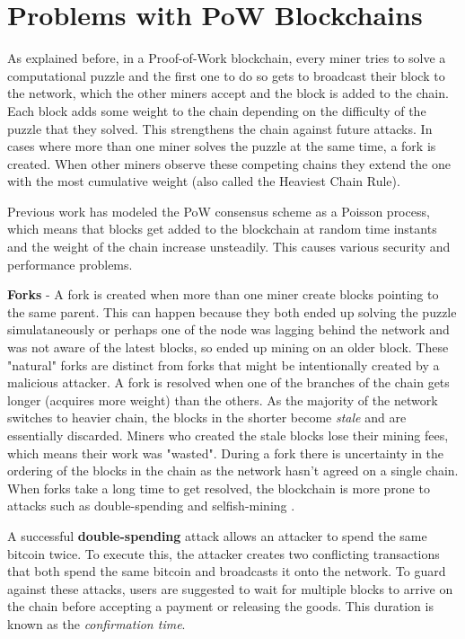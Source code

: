 
\newpage
\section{Problems with PoW Blockchains} \label{intro-problems}


As explained before, in a Proof-of-Work blockchain, every miner tries to solve a computational puzzle and the first one to do so gets to broadcast their block to the network, which the other miners accept and the block is added to the chain. 
Each block adds some weight to the chain depending on the difficulty of the puzzle that they solved. 
This strengthens the chain against future attacks.
In cases where more than one miner solves the puzzle at the same time, a fork is created. 
When other miners observe these competing chains they extend the one with the most cumulative weight (also called the Heaviest Chain Rule). 

Previous work \cite{bitcoinOriginal, Rosenfeld} has modeled the PoW consensus scheme as a Poisson process, which means that blocks get added to the blockchain at random time instants and the weight of the chain increase unsteadily. 
This causes various security and performance problems.

\textbf{Forks} - A fork is created when more than one miner create blocks pointing to the same parent. 
This can happen because they both ended up solving the puzzle simulataneously or perhaps one of the node was lagging behind the network and was not aware of the latest blocks, so ended up mining on an older block. 
These "natural" forks are distinct from forks that might be intentionally created by a malicious attacker.
A fork is resolved when one of the branches of the chain gets longer (acquires more weight) than the others.
As the majority of the network switches to heavier chain, the blocks in the shorter become \textit{stale} and are essentially discarded. 
Miners who created the stale blocks lose their mining fees, which means their work was "wasted".
During a fork there is uncertainty in the ordering of the blocks in the chain as the network hasn't agreed on a single chain.
When forks take a long time to get resolved, the blockchain is more prone to attacks such as double-spending and selfish-mining \cite{selfishmining, selfishMiningStrategies}. 

A successful \textbf{double-spending} attack allows an attacker to spend the same bitcoin twice.
To execute this, the attacker creates two conflicting transactions that both spend the same bitcoin and broadcasts it onto the network. 
To guard against these attacks, users are suggested to wait for multiple blocks to arrive on the chain before accepting a payment or releasing the goods. This duration is known as the \textit{confirmation time}.

